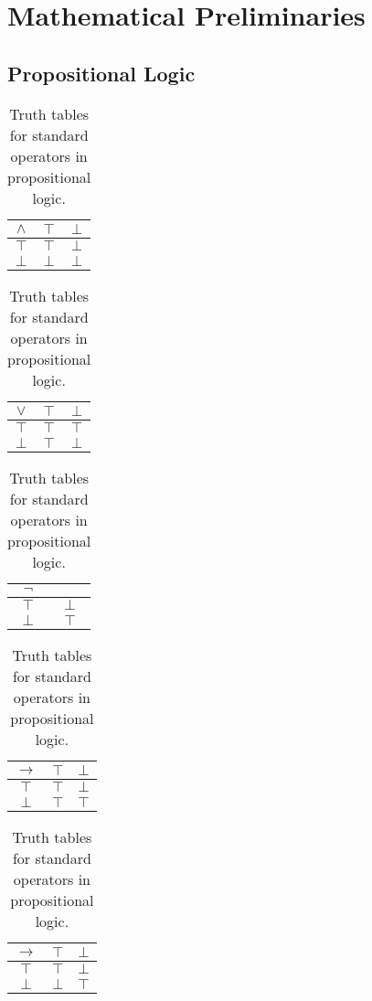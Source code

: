 \chapter{Mathematical Preliminaries}\label{chp:prelim} 
\section{Propositional Logic}

\begin{table}
\begin{center}


\begin{tabular}{ c | c c }
  $\land$& $\top$ & $\bot$ \\ \hline
 $\top$ & $\top$ & $\bot$ \\  
 $\bot$ & $\bot$ &  $\bot$
\end{tabular}
\quad
\begin{tabular}{ c | c c }
  $\lor$& $\top$ & $\bot$ \\ \hline
 $\top$ & $\top$ & $\top$ \\  
 $\bot$ & $\top$ &  $\bot$
\end{tabular}
\quad
\begin{tabular}{ c | c }
  $\lnot$& \\ \hline
 $\top$ & $\bot$ \\  
 $\bot$ & $\top$
\end{tabular}

\begin{tabular}{ c | c c }
  $\rightarrow$& $\top$ & $\bot$ \\ \hline
 $\top$ & $\top$ & $\bot$ \\  
 $\bot$ & $\top$ &  $\top$
\end{tabular}
\quad
\begin{tabular}{ c | c c }
  $\rightarrow$& $\top$ & $\bot$ \\ \hline
 $\top$ & $\top$ & $\bot$ \\  
 $\bot$ & $\bot$ &  $\top$
\end{tabular}

\caption{Truth tables for standard operators in propositional logic.}
\label{tbl:prop}

\end{center}
\end{table}

